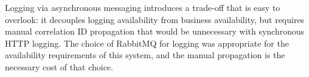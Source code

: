 Logging via asynchronous messaging introduces a trade-off that is easy to overlook: it decouples logging availability from business availability, but requires manual correlation ID propagation that would be unnecessary with synchronous HTTP logging. The choice of RabbitMQ for logging was appropriate for the availability requirements of this system, and the manual propagation is the necessary cost of that choice.